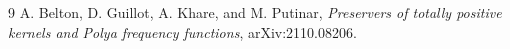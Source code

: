 \begin{thebibliography}{9}
A. Belton, D. Guillot, A. Khare, and M. Putinar,
\emph{Preservers of totally positive kernels and Polya frequency functions},
arXiv:2110.08206.
\end{thebibliography}
